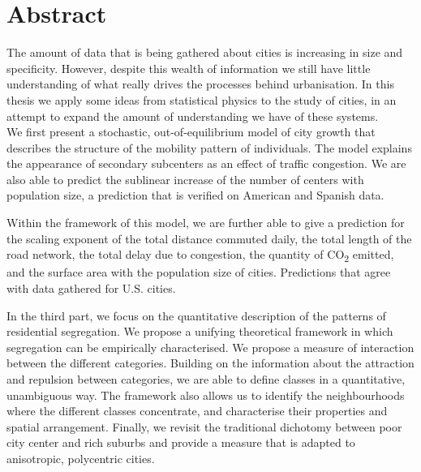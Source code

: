 

\begingroup
\let\clearpage\relax
\let\cleardoublepage\relax
\let\cleardoublepage\relax

\chapter*{Abstract} %


The amount of data that is being gathered about cities is increasing in size and
specificity. However, despite this wealth of information we still have little
understanding of what really drives the processes behind urbanisation. In this
thesis we apply some ideas from statistical physics to the study of cities, in
an attempt to expand the amount of understanding we have of these systems.\\ 



We first present a stochastic, out-of-equilibrium model of city growth that describes
the structure of the mobility pattern of individuals. The model explains the
appearance of secondary subcenters as an effect of traffic congestion. We are
also able to predict the sublinear increase of the number of centers with
population size, a prediction that is verified on American and Spanish data. 

Within the framework of this model, we are further able to give a prediction for the
scaling exponent of the total distance commuted daily, the total length of the
road network, the total delay due to congestion, the quantity of
CO\textsubscript{2} emitted, and the surface area with the population size of
cities. Predictions that agree with data gathered for U.S. cities.

In the third part, we focus on the quantitative description of the
patterns of residential segregation. We propose a unifying theoretical framework
in which segregation can be empirically characterised. We propose a measure of
interaction between the different categories. Building on the information about
the attraction and repulsion between categories, we are able to define classes
in a quantitative, unambiguous way. The framework also allows us to identify the
neighbourhoods where the different classes concentrate, and characterise their
properties and spatial arrangement. Finally, we revisit the traditional
dichotomy between poor city center and rich suburbs and provide a measure that
is adapted to anisotropic, polycentric cities.

